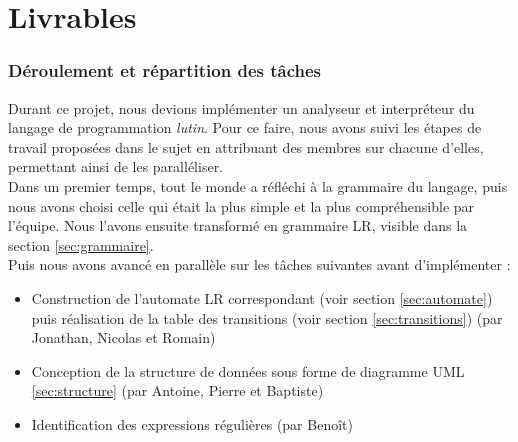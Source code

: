





\tableofcontents

\listoffigures

\listoftables

\newpage

\part{Livrables}

\section{Déroulement et répartition des tâches}

Durant ce projet, nous devions implémenter un analyseur et interpréteur du langage de programmation \textit{lutin}. Pour ce faire, nous avons suivi les étapes de travail proposées dans le sujet en attribuant des membres sur chacune d'elles, permettant ainsi de les paralléliser. \\

Dans un premier temps, tout le monde a réfléchi à la grammaire du langage, puis nous avons choisi celle qui était la plus simple et la plus compréhensible par l'équipe. Nous l'avons ensuite transformé en grammaire LR, visible dans la section \ref{sec:grammaire}. \\

Puis nous avons avancé en parallèle sur les tâches suivantes avant d'implémenter :
\begin{itemize}
	\item Construction de l'automate LR correspondant (voir section \ref{sec:automate}) puis réalisation de la table des transitions (voir section \ref{sec:transitions}) (par Jonathan, Nicolas et Romain)
	\item Conception de la structure de données sous forme de diagramme UML \ref{sec:structure} (par Antoine, Pierre et Baptiste)
	\item Identification des expressions régulières (par Benoît) \\
\end{itemize}

